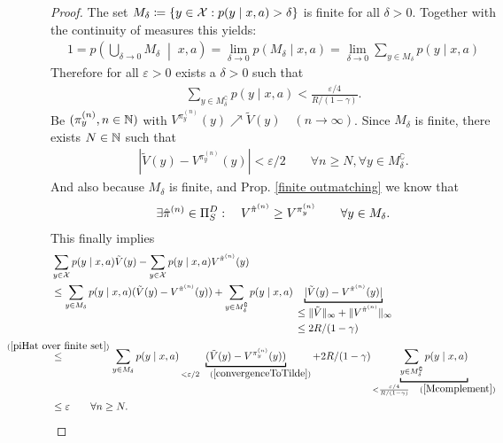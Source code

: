 \begin{proof}
	The set \(M_\delta\coloneqq \{y\in\mathcal{X} : p(y\mid x,a)>\delta \} \) is finite for all \(\delta>0\). Together with the continuity of measures this yields:
	\begin{align*}
		1=p\left(\bigcup_{\delta \to 0} M_\delta \;\middle|\; x, a \right)
		= \lim_{\delta\to 0} p(M_\delta\mid x,a)
		=\lim_{\delta\to 0} \sum_{y\in M_\delta} p(y\mid x,a)
	\end{align*}
	Therefore for all \(\varepsilon >0\) exists a \(\delta>0\) such that
	\begin{align}
		\sum_{y\in M_\delta^\complement}p(y\mid x,a) < \frac{\varepsilon /4}{R/(1-\gamma)}.
		\label{Mcomplement}
	\end{align}
	Be \((\pi_y^{(n)},n\in\mathbb{N} )\) with \(V^{\pi_y^{(n)}}(y) \nearrow \tilde{V}(y) \quad (n\to\infty) \). Since \(M_\delta\) is finite, there exists \(N\in\mathbb{N} \) such that
	\begin{align}
		|\tilde{V}(y) -V^{\pi_y^{(n)}}(y)|< \varepsilon/2
		\qquad \forall n\ge N, \forall y\in M_\delta^\complement.
		\label{convergenceToTilde}
	\end{align}
	And also because \(M_\delta \) is finite, and Prop. \ref{finite outmatching} we know that
	\begin{align}
	\exists\hat{\pi}^{(n)}\in\Pi_S^D : 
	\quad {V^{\hat{\pi}^{(n)}}\ge V^{\pi_y^{(n)}}}
	\qquad \forall y\in M_\delta.
	\label{piHat over finite set}
	\end{align}
	This finally implies
	\begin{align*}
		&\sum_{y\in\cX}p(y\mid x,a)\tilde{V}(y) 
		- \sum_{y\in\cX}p(y\mid x,a) V^{\hat{\pi}^{(n)}}(y) \\
		&\le \sum_{y\in M_\delta}p(y\mid x,a) (\tilde{V}(y) - V^{\hat{\pi}^{(n)}}(y))
		+ \sum_{y\in M_\delta^\complement}p(y\mid x,a) 
		\underbracket[1pt]{|\tilde{V}(y) - V^{\hat{\pi}^{(n)}}(y)|}_{
			\begin{aligned}
				&\le \|\tilde{V}\|_\infty + \| V^{\hat{\pi}^{(n)}}\|_\infty\\
				&\le 2R/(1-\gamma)
			\end{aligned}
		} \\
		&\lxlq{(\ref{piHat over finite set})} \sum_{y\in M_\delta}p(y\mid x,a) 
		\underbracket[1pt]{(\tilde{V}(y) - V^{\pi_y^{(n)}}(y))}_{
			<\varepsilon/2\quad(\ref{convergenceToTilde})
		}
		+ 2R/(1-\gamma) \underbracket[1pt]{\sum_{y\in M_\delta^\complement}p(y\mid x,a)}_{
			< \frac{\varepsilon /4}{R/(1-\gamma)}\quad(\ref{Mcomplement})
		}\\
		&\le \varepsilon \qquad \forall n\ge N.

\end{align*}
\end{proof}

